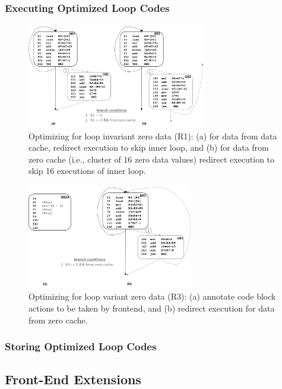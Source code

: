 \subsubsection{Executing Optimized Loop Codes}


\begin{figure}[h]
\centering
\includegraphics[height=1.8in, width=.95\columnwidth]{Figures/loop-invariant-zopt.png}
\caption{Optimizing for loop invariant zero data (R1): (a) for data from data cache, redirect execution to skip inner loop, and (b) for data from zero cache (i.e., cluster of $16$ zero data values) redirect execution to skip 16 executions of inner loop.}
\label{fig:deltas_loop_inv_opt}
\end{figure}



\begin{figure}[h]
\centering
\includegraphics[height=1.8in, width=.95\columnwidth]{Figures/loop-variant-zopt.png}
\caption{Optimizing for loop variant zero data (R3):  (a) annotate code block actions to be taken by frontend, and (b) redirect execution for data from zero cache.}
\label{fig:deltas_loop_var_opt}
\end{figure}

\subsubsection{Storing Optimized Loop Codes}


\subsection{Front-End Extensions}
